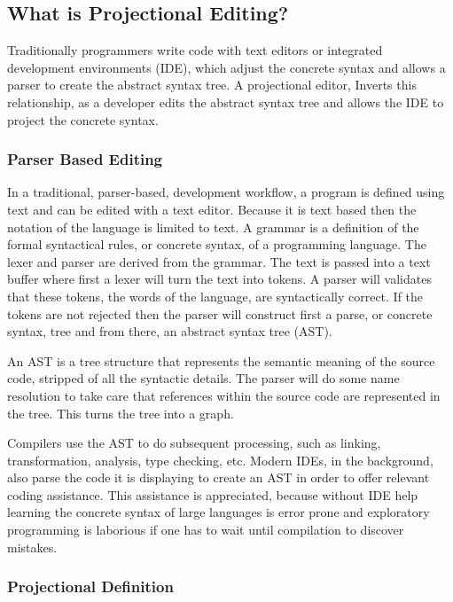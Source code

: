 \subsection{What is Projectional Editing?}
\label{section:WhatIsPE}

Traditionally programmers write code with text editors or integrated development environments (IDE), which adjust the concrete syntax and allows a parser to create the abstract syntax tree.
A projectional editor, Inverts this relationship, as a developer edits the abstract syntax tree and allows the IDE to project the concrete syntax.

\subsubsection{Parser Based Editing}


In a traditional, parser-based, development workflow, a program is defined using text and can be edited with a text editor.
Because it is text based then the notation of the language is limited to text.
A grammar is a definition of the formal syntactical rules, or concrete syntax, of a programming language.
The lexer and parser are derived from the grammar.
The text is passed into a text buffer where first a lexer will turn the text into tokens.
A parser will validates that these tokens, the words of the language, are syntactically correct.
If the tokens are not rejected then the parser will construct first a parse, or concrete syntax, tree and from there, an abstract syntax tree (AST).

An AST is a tree structure that represents the semantic meaning of the source code, stripped of all the syntactic details.
The parser will do some name resolution to take care that references within the source code are represented in the tree.
This turns the tree into a graph.

Compilers use the AST to do subsequent processing, such as linking, transformation, analysis, type checking, etc.
Modern IDEs, in the background, also parse the code it is displaying to create an AST in order to offer relevant coding assistance.
This assistance is appreciated, because without IDE help learning the concrete syntax of large languages is error prone and exploratory programming is laborious if one has to wait until compilation to discover mistakes.


\subsubsection{Projectional Definition}

